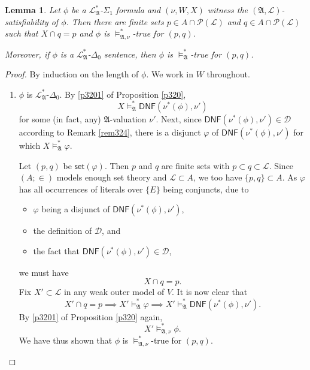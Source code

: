\documentclass[12pt, twoside]{memoir}
\numberwithin{equation}{section}
\newtheorem{lem}[thm]{Lemma}
\theoremstyle{definition}
\theoremstyle{remark}
\theoremstyle{definition}
\theoremstyle{definition}
\theoremstyle{definition}
\theoremstyle{remark}
\begin{document}
\begin{lem}\label{exist}
Let $\phi$ be a $\mathcal{L}^{*}_{\mathfrak{A}}$-$\Sigma_1$ formula and $(\nu, W, X)$ witness the $(\mathfrak{A}, \mathcal{L})$-satisfiability of $\phi$. Then there are finite sets $p \in A \cap \mathcal{P}(\mathcal{L})$ and $q \in A \cap \mathcal{P}(\mathcal{L})$ such that $X \cap q = p$ and $\phi$ is $\models^*_{\mathfrak{A}, \nu}$-true for $(p, q)$.

Moreover, if $\phi$ is a $\mathcal{L}^{*}_{\mathfrak{A}}$-$\Delta_0$ sentence, then $\phi$ is $\models^*_{\mathfrak{A}}$-true for $(p, q)$.
\end{lem}

\begin{proof}
By induction on the length of $\phi$. We work in $W$ throughout.
\begin{enumerate}[label=Case \arabic*:, leftmargin=50pt]
    \item $\phi$ is $\mathcal{L}^{*}_{\mathfrak{A}}$-$\Delta_0$. By \ref{p3201} of Proposition \ref{p320}, $$X \models^*_{\mathfrak{A}} \mathsf{DNF}(\nu^*(\phi), \nu')$$ for some (in fact, any) $\mathfrak{A}$-valuation $\nu'$. Next, since $\mathsf{DNF}(\nu^*(\phi), \nu') \in \mathcal{D}$ according to Remark \ref{rem324}, there is a disjunct $\varphi$ of $\mathsf{DNF}(\nu^*(\phi), \nu')$ for which $X \models^*_{\mathfrak{A}} \varphi$. 
    
    Let $(p, q)$ be $\mathsf{set}(\varphi)$. Then $p$ and $q$ are finite sets with $p \subset q \subset \mathcal{L}$. Since $(A; \in)$ models enough set theory and $\mathcal{L} \subset A$, we too have $\{p, q\} \subset A$. As $\varphi$ has all occurrences of literals over $\{E\}$ being conjuncts, due to 
    \begin{itemize}
        \item $\varphi$ being a disjunct of $\mathsf{DNF}(\nu^*(\phi), \nu')$,
        \item the definition of $\mathcal{D}$, and 
        \item the fact that $\mathsf{DNF}(\nu^*(\phi), \nu') \in \mathcal{D}$, 
    \end{itemize} 
    we must have $$X \cap q = p.$$ Fix $X' \subset \mathcal{L}$ in any weak outer model of $V$. It is now clear that $$X' \cap q = p \implies X' \models^*_{\mathfrak{A}} \varphi \implies X' \models^*_{\mathfrak{A}} \mathsf{DNF}(\nu^*(\phi), \nu').$$ By \ref{p3201} of Proposition \ref{p320} again, $$X' \models^*_{\mathfrak{A}, \nu} \phi \text{.}$$ We have thus shown that $\phi$ is $\models^*_{\mathfrak{A}, \nu}$-true for $(p, q)$.


\end{enumerate}
\end{proof}
\end{document}
